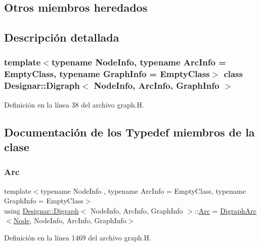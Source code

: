 \subsection*{Otros miembros heredados}


\subsection{Descripción detallada}
\subsubsection*{template$<$typename Node\+Info, typename Arc\+Info = Empty\+Class, typename Graph\+Info = Empty\+Class$>$\newline
class Designar\+::\+Digraph$<$ Node\+Info, Arc\+Info, Graph\+Info $>$}



Definición en la línea 38 del archivo graph.\+H.



\subsection{Documentación de los \textquotesingle{}Typedef\textquotesingle{} miembros de la clase}
\mbox{\label{class_designar_1_1_digraph_a0ceb278671f2a535c00fddccdeafd69f}} 
\subsubsection{\texorpdfstring{Arc}{Arc}}
{\footnotesize\ttfamily template$<$typename Node\+Info , typename Arc\+Info  = Empty\+Class, typename Graph\+Info  = Empty\+Class$>$ \\
using \hyperlink{class_designar_1_1_digraph}{Designar\+::\+Digraph}$<$ Node\+Info, Arc\+Info, Graph\+Info $>$\+::\hyperlink{class_designar_1_1_digraph_a0ceb278671f2a535c00fddccdeafd69f}{Arc} =  \hyperlink{class_designar_1_1_digraph_arc}{Digraph\+Arc}$<$\hyperlink{class_designar_1_1_digraph_a4dc921c41a480b7946a04170e997d8ae}{Node}, Node\+Info, Arc\+Info, Graph\+Info$>$}



Definición en la línea 1469 del archivo graph.\+H.

\mbox{\label{class_designar_1_1_digraph_a84a736f6c32da0fcbd1d047e74264d00}} 
